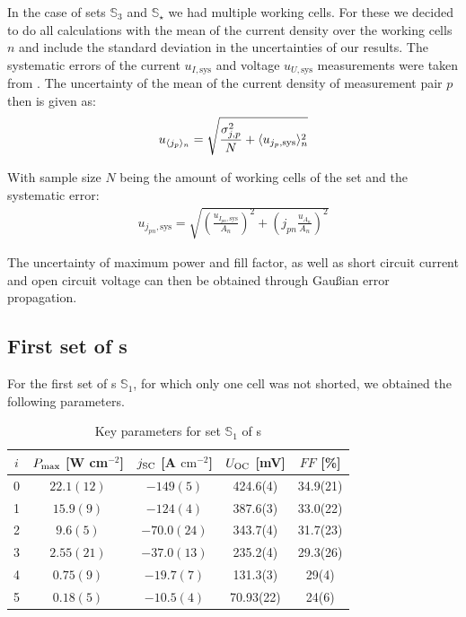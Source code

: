 \documentclass[a4paper,10pt,twocolumn]{article}
\begin{document}
\begin{extract*}
In the case of sets $\mathbb{S}_3$ and $\mathbb{S}_\star$ we had multiple working cells. For these we decided to do all calculations with the mean of the current density over the working cells $n$ and include the standard deviation in the uncertainties of our results. The systematic errors of the current $u_{I,\text{sys}}$ and voltage $u_{U,\text{sys}}$ measurements were taken from \cite{keithley}. The uncertainty of the mean of the current density of measurement pair $p$ then is given as:
\begin{align}
	u_{\langle j_p \rangle_n} = \sqrt{\frac{\sigma_{j,p}^2}{N} + \langle u_{j_p,\text{sys}} \rangle_n^2}
\end{align}

With sample size $N$ being the amount of working cells of the set and the systematic error:
\begin{align}
	u_{j_{pn},\text{sys}} = \sqrt{ \left( \frac{ u_{I_{pn},\text{sys}}}{A_n}\right)^2+\left( j_{pn}\frac{u_{A_n}}{A_n} \right)^2}
\end{align}

The uncertainty of maximum power and fill factor, as well as short circuit current and open circuit voltage can then be obtained through Gaußian error propagation.

\subsection{First set of \BHSC s}\label{subsec:S1data}

For the first set of \BHSC s $\mathbb{S}_1$, for which only one cell was not shorted, we obtained the following parameters.
\begin{table}[H]\centering
	\caption{Key parameters for set $\mathbb{S}_1$ of \BHSC s}
	\label{tab:keyparams1}
	\begin{tabular}{@{}ccccc@{}}\toprule
		$i$ & $P_{\text{max}}$ [\textmu W cm$^{-2}$] & $j_{\text{SC}}$ [\textmu A $\mathrm{cm}^{-2}$] & $U_{\text{OC}}$ [mV] & $FF$ [\%]\\\midrule
		0 &  $ 22.1(12) $ & $ -149(5) $ & 424.6(4) & 34.9(21) \\
		1 &  $ 15.9(9) $ & $ -124(4) $ & 387.6(3) & 33.0(22) \\
		2 &  $ 9.6(5) $ & $ -70.0(24) $ & 343.7(4) & 31.7(23) \\
		3 &  $ 2.55(21) $ & $ -37.0(13) $ & 235.2(4) & 29.3(26) \\
		4 &  $ 0.75(9) $ & $ -19.7(7) $ & 131.3(3) & 29(4)\\
		5 &  $ 0.18(5) $ & $ -10.5(4) $ & 70.93(22) & 24(6) \\\bottomrule
	\end{tabular}
\end{table}


\end{extract*}
\end{document}
